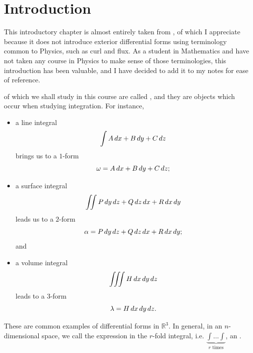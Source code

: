 \documentclass[notoc,notitlepage]{tufte-book}
\begin{document}

\chapter*{Introduction}%
\label{chp:introduction}

This introductory chapter is almost entirely taken from \citet{flanders1989}, of
which I appreciate because it does not introduce exterior differential forms
using terminology common to Physics, such as curl and flux. As a student in
Mathematics and have not taken any course in Physics to make sense of those
terminologies, this introduction has been valuable, and I have decided to add it
to my notes for ease of reference.

 of which we shall study in this course are
called , and they are objects which occur
when studying integration. For instance,
\begin{itemize}
  \item a line integral
    \begin{equation*}
      \int A \mathop{}\!d{x} + B \mathop{}\!d{y} + C \mathop{}\!d{z}
    \end{equation*}
    brings us to a $1$-form
    \begin{equation*}
      \omega = A \mathop{}\!d{x} + B \mathop{}\!d{y} + C \mathop{}\!d{z};
    \end{equation*}
  \item a surface integral
    \begin{equation*}
      \iint P \mathop{}\!d{y} \mathop{}\!d{z} + Q \mathop{}\!d{z} \mathop{}\!d{x} + R \mathop{}\!d{x} \mathop{}\!d{y}
    \end{equation*}
    leads us to a $2$-form
    \begin{equation}\label{eq:intro_2_form}
      \alpha = P \mathop{}\!d{y} \mathop{}\!d{z} + Q \mathop{}\!d{z} \mathop{}\!d{x} + R \mathop{}\!d{x} \mathop{}\!d{y};
    \end{equation}
    and
  \item a volume integral
    \begin{equation*}
      \iiint H \mathop{}\!d{x} \mathop{}\!d{y} \mathop{}\!d{z}
    \end{equation*}
    leads to a $3$-form
    \begin{equation*}
      \lambda = H \mathop{}\!d{x} \mathop{}\!d{y} \mathop{}\!d{z}.
    \end{equation*}
\end{itemize}
These are common examples of differential forms in $\mathbb{R}^3$. In general,
in an $n$-dimensional space, we call the expression in the $r$-fold integral,
i.e. $\underbrace{\int \hdots \int}_{r \text{ times}}$, an  .
\end{document}
